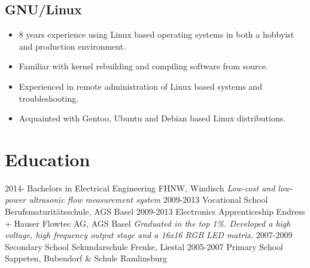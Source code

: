 \documentclass[]{friggeri-cv}
\begin{document}
\subsection{GNU/Linux}
\begin{itemize}
    \item 8 years experience using Linux based operating systems in both a hobbyist and production environment.
    \item Familiar with kernel rebuilding and compiling software from source.
    \item Experienced in remote administration of Linux based systems and troubleshooting.
    \item Acquainted with Gentoo, Ubuntu and Debian based Linux distributions.
\end{itemize}

\section{Education}

\begin{entrylist}
  \entry
    {2014-}
    {Bachelors in Electrical Engineering}
    {FHNW, Windisch}
    {\emph{Low-cost and low-power ultrasonic flow measurement system}}
  \entry
    {2009-2013}
    {Vocational School}
    {Berufsmaturit\"atsschule, AGS Basel}
    {}
  \entry
    {2009-2013}
    {Electronics Apprenticeship}
    {Endress + Hauser Flowtec AG, AGS Basel}
    {\emph{Graduated in the top 1\%. Developed a high voltage, high frequency output stage and a 16x16 RGB LED matrix.}}
  \entry
    {2007-2009}
    {Secondary School}
    {Sekundarschule Frenke, Liestal}
    {}
  \entry
    {2005-2007}
    {Primary School}
    {Sappeten, Bubendorf \& Schule Ramlinsburg}
    {}
\end{entrylist}
\end{document}

